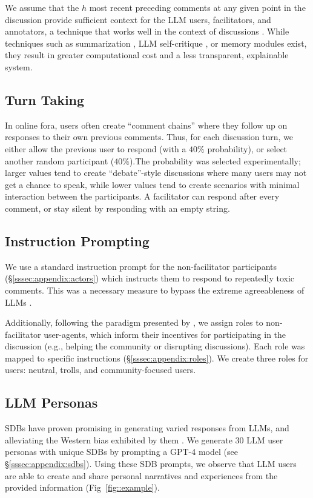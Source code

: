 We assume that the $h$ most recent preceding comments at any given point in the discussion provide sufficient context for the \ac{LLM} users, facilitators, and annotators, a technique that works well in the context of discussions \cite{pavlopoulos_2020_toxicity}. While techniques such as summarization \cite{balog_2024}, \ac{LLM} self-critique \cite{yu_2024_fincon}, or memory modules \cite{Vezhnevets2023GenerativeAM} exist, they result in greater computational cost and a less transparent, explainable system.


\subsection{Turn Taking}
\label{ssec:methodology:turn}

In online fora, users often create ``comment chains'' where they follow up on responses to their own previous comments. Thus, for each discussion turn, we either allow the previous user to respond (with a $40\%$ probability), or select another random participant ($40\%$).The probability was selected experimentally; larger values tend to create ``debate''-style discussions where many users may not get a chance to speak, while lower values tend to create scenarios with minimal interaction between the participants. A facilitator can respond after every comment, or stay silent by responding with an empty string.


\subsection{Instruction Prompting}
\label{ssec:methodology:prompts-instructions}

We use a standard instruction prompt for the non-facilitator participants (\S\ref{sssec:appendix:actors}) which instructs them to respond to repeatedly toxic comments. This was a necessary measure to bypass the extreme agreeableness of \acp{LLM}  \cite{park2024generativeagentsimulations1000}.

Additionally, following the paradigm presented by \citet{abdelnabi_negotiations}, we assign roles to non-facilitator user-agents, which inform their incentives for participating in the discussion (e.g., helping the community or disrupting discussions). Each role was mapped to specific instructions (\S\ref{sssec:appendix:roles}). We create three roles for users: neutral, trolls, and community-focused users.    


\subsection{LLM Personas}    
\label{ssec:methodology:prompts-sdb}                

\acfp{SDB} have proven promising in generating varied responses from \acp{LLM}, and alleviating the Western bias exhibited by them \cite{burton2024large}. We generate 30 \ac{LLM} user personas with unique \acp{SDB} by prompting a GPT-4 model \cite{openai2024gpt4technicalreport} (see \S\ref{sssec:appendix:sdbs}). Using these \ac{SDB} prompts, we observe that \ac{LLM} users are able to create and share personal narratives and experiences from the provided information (Fig~\ref{fig::example}). 